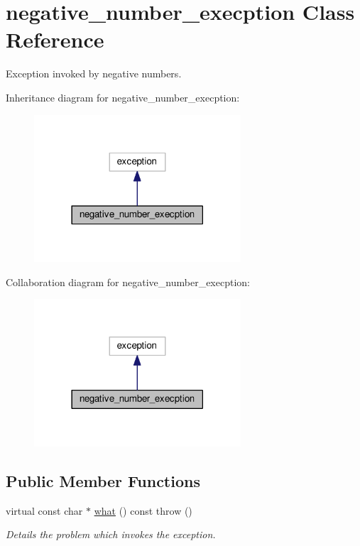 \hypertarget{classnegative__number__execption}{}\section{negative\+\_\+number\+\_\+execption Class Reference}
\label{classnegative__number__execption}


Exception invoked by negative numbers.  




Inheritance diagram for negative\+\_\+number\+\_\+execption\+:\nopagebreak
\begin{figure}[H]
\begin{center}
\leavevmode
\includegraphics[width=218pt]{classnegative__number__execption__inherit__graph}
\end{center}
\end{figure}


Collaboration diagram for negative\+\_\+number\+\_\+execption\+:\nopagebreak
\begin{figure}[H]
\begin{center}
\leavevmode
\includegraphics[width=218pt]{classnegative__number__execption__coll__graph}
\end{center}
\end{figure}
\subsection*{Public Member Functions}
\begin{DoxyCompactItemize}
\item 
virtual const char $\ast$ \hyperlink{classnegative__number__execption_a28ed25ccd00b4a7972aa089dca7c433c}{what} () const   throw ()
\begin{DoxyCompactList}\small\item\em Details the problem which invokes the exception. \end{DoxyCompactList}\end{DoxyCompactItemize}
